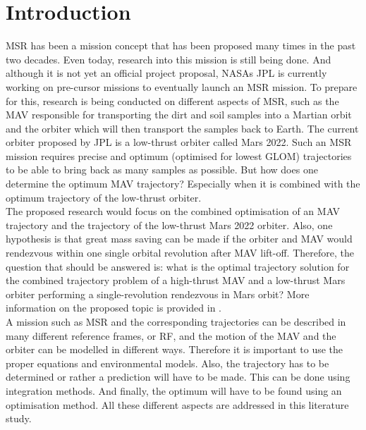 \chapter{Introduction}  %
\label{ch:intro}
\acf{MSR} has been a mission concept that has been proposed many times in the past two decades. Even today, research into this mission is still being done. And although it is not yet an official project proposal, NASAs \acf{JPL} is currently working on pre-cursor missions to eventually launch an \ac{MSR} mission. To prepare for this, research is being conducted on different aspects of \ac{MSR}, such as the \acf{MAV} responsible for transporting the dirt and soil samples into a Martian orbit and the orbiter which will then transport the samples back to Earth. The current orbiter proposed by \ac{JPL} is a low-thrust orbiter called Mars 2022. Such an \ac{MSR} mission requires precise and optimum (optimised for lowest \ac{GLOM}) trajectories to be able to bring back as many samples as possible. But how does one determine the optimum \ac{MAV} trajectory? Especially when it is combined with the optimum trajectory of the low-thrust orbiter. \\
The proposed research would focus on the combined optimisation of an \ac{MAV} trajectory and the trajectory of the low-thrust Mars 2022 orbiter. Also, one hypothesis is that great mass saving can be made if the orbiter and \ac{MAV} would rendezvous within one single orbital revolution after \ac{MAV} lift-off. Therefore, the question that should be answered is: what is the optimal trajectory solution for the combined trajectory problem of a high-thrust \ac{MAV} and a low-thrust Mars orbiter performing a single-revolution rendezvous in Mars orbit? More information on the proposed topic is provided in . \\
A mission such as \ac{MSR} and the corresponding trajectories can be described in many different reference frames, or \ac{RF}, and the motion of the \ac{MAV} and the orbiter can be modelled in different ways. Therefore it is important to use the proper equations and environmental models. Also, the trajectory has to be determined or rather a prediction will have to be made. This can be done using integration methods. And finally, the optimum will have to be found using an optimisation method. All these different aspects are addressed in this literature study.\\
